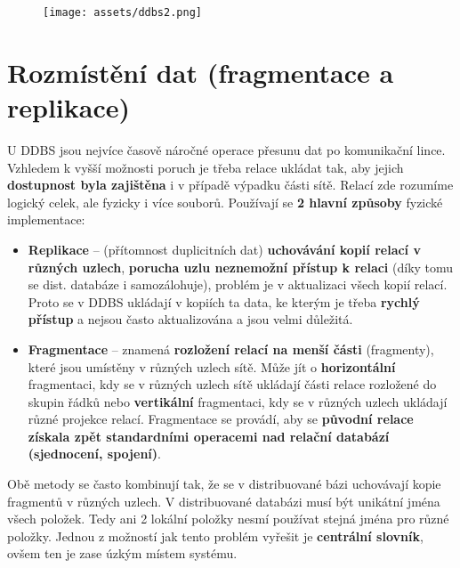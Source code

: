 \begin{figure}[H]
  \centering
  \texttt{[image: assets/ddbs2.png]}
\end{figure}
\section{Rozmístění dat (fragmentace a replikace)}
U DDBS jsou nejvíce časově náročné operace přesunu dat po komunikační lince. Vzhledem k vyšší možnosti poruch je třeba relace ukládat tak, aby jejich \textbf{dostupnost byla zajištěna} i v případě výpadku části sítě. Relací zde rozumíme logický celek, ale fyzicky i více souborů. Používají se \textbf{2 hlavní způsoby} fyzické implementace:
\begin{itemize}
  \item \textbf{Replikace} -- (přítomnost duplicitních dat) \textbf{uchovávání kopií relací v různých uzlech}, \textbf{porucha uzlu neznemožní přístup k relaci} (díky tomu se dist. databáze i samozálohuje), problém je v aktualizaci všech kopií relací. Proto se v DDBS ukládají v kopiích ta data, ke kterým je třeba \textbf{rychlý přístup} a nejsou často aktualizována a jsou velmi důležitá.
  \item \textbf{Fragmentace} --  znamená \textbf{rozložení relací na menší části} (fragmenty), které jsou umístěny v různých
        uzlech sítě. Může jít o \textbf{horizontální} fragmentaci, kdy se v různých uzlech sítě ukládají části relace rozložené do skupin řádků nebo \textbf{vertikální} fragmentaci, kdy se v různých uzlech ukládají různé  projekce relací. Fragmentace se provádí, aby se \textbf{původní relace získala zpět standardními operacemi nad relační databází (sjednocení, spojení)}.
\end{itemize}
Obě metody se často kombinují tak, že se v distribuované bázi uchovávají kopie fragmentů v různých uzlech.
V distribuované databázi musí být unikátní jména všech položek. Tedy ani 2 lokální položky nesmí používat
stejná jména pro různé položky. Jednou z možností jak tento problém vyřešit je \textbf{centrální slovník}, ovšem ten
je zase úzkým místem systému.